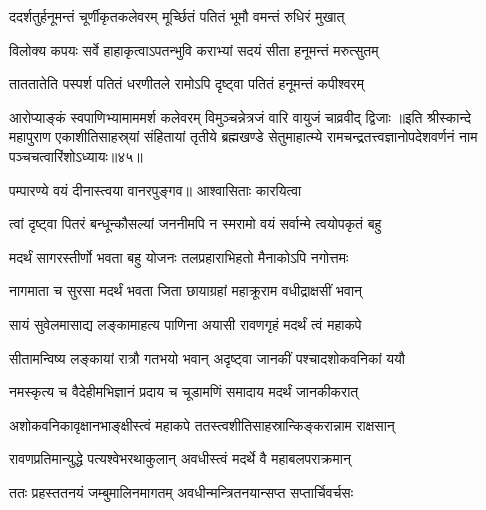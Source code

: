 \twolineshloka
{ददर्शतुर्हनूमन्तं चूर्णीकृतकलेवरम्}
{मूर्च्छितं पतितं भूमौ वमन्तं रुधिरं मुखात्}%

\twolineshloka
{विलोक्य कपयः सर्वे हाहाकृत्वाऽपतन्भुवि}
{कराभ्यां सदयं सीता हनूमन्तं मरुत्सुतम्}%

\twolineshloka
{ताततातेति पस्पर्श पतितं धरणीतले}
{रामोऽपि दृष्ट्वा पतितं हनूमन्तं कपीश्वरम्}%

\twolineshloka
{आरोप्याङ्कं स्वपाणिभ्यामाममर्श कलेवरम्}
{विमुञ्चन्नेत्रजं वारि वायुजं चाव्रवीद् द्विजाः}%
॥इति श्रीस्कान्दे महापुराण एकाशीतिसाहस्र्यां संहितायां तृतीये ब्रह्मखण्डे सेतुमाहात्म्ये रामचन्द्रतत्त्वज्ञानोपदेशवर्णनं नाम पञ्चचत्वारिंशोऽध्यायः॥४५॥


\vakta{}
\shrota{}
\tags{}
\notes{}

\storymeta






\twolineshloka
{पम्पारण्ये वयं दीनास्त्वया वानरपुङ्गव॥}
{आश्वासिताः कारयित्वा}%

\twolineshloka
{त्वां दृष्ट्वा पितरं बन्धून्कौसल्यां जननीमपि}
{न स्मरामो वयं सर्वान्मे त्वयोपकृतं बहु}%

\twolineshloka
{मदर्थं सागरस्तीर्णो भवता बहु योजनः}
{तलप्रहाराभिहतो मैनाकोऽपि नगोत्तमः}%

\twolineshloka
{नागमाता च सुरसा मदर्थं भवता जिता}
{छायाग्रहां महाक्रूराम वधीद्राक्षसीं भवान्}%

\twolineshloka
{सायं सुवेलमासाद्य लङ्कामाहत्य पाणिना}
{अयासी रावणगृहं मदर्थं त्वं महाकपे}%

\twolineshloka
{सीतामन्विष्य लङ्कायां रात्रौ गतभयो भवान्}
{अदृष्ट्वा जानकीं पश्चादशोकवनिकां ययौ}%

\twolineshloka
{नमस्कृत्य च वैदेहीमभिज्ञानं प्रदाय च}
{चूडामणिं समादाय मदर्थं जानकीकरात्}%

\twolineshloka
{अशोकवनिकावृक्षानभाङ्क्षीस्त्वं महाकपे}
{ततस्त्वशीतिसाहस्रान्किङ्करान्नाम राक्षसान्}%

\twolineshloka
{रावणप्रतिमान्युद्धे पत्यश्वेभरथाकुलान्}
{अवधीस्त्वं मदर्थे वै महाबलपराक्रमान्}%

\twolineshloka
{ततः प्रहस्ततनयं जम्बुमालिनमागतम्}
{अवधीन्मन्त्रितनयान्सप्त सप्तार्चिवर्चसः}%

